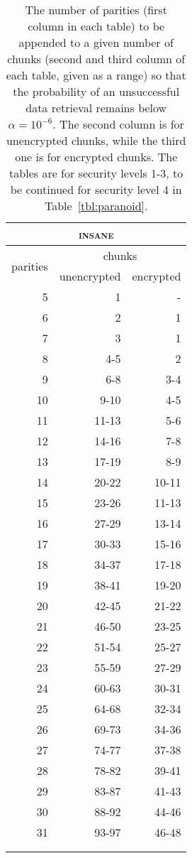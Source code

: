 \documentclass[a4paper,11pt]{article}
\begin{document}
\begin{table}[!ht]
\begin{minipage}{.49\linewidth}
\begin{tabular}{|r|r|r|}
\multicolumn{3}{c}{\textsc{insane}}\\\hline
\multirow{2}{1.5cm}{\centering 
 parities } 
&\multicolumn{2}{|c|}{ chunks }\\\cline{2-3}
&\multicolumn{1}{|c|}{unencrypted} 
&\multicolumn{1}{|c|}{encrypted} \\\hline\hline
5 & 1     &-   \\
6 & 2     & 1\\
7 & 3     & 1\\ 
8 & 4-5   & 2\\ 
9 & 6-8   & 3-4\\
10 & 9-10  & 4-5\\
11 & 11-13 & 5-6\\
12 & 14-16 & 7-8\\
13 & 17-19 & 8-9\\
14 & 20-22 & 10-11\\
15 & 23-26 & 11-13\\
16 & 27-29 & 13-14\\
17 & 30-33 & 15-16\\
18 & 34-37 & 17-18\\
19 & 38-41 & 19-20\\
20 & 42-45 & 21-22\\
21 & 46-50 & 23-25\\
22 & 51-54 & 25-27\\
23 & 55-59 & 27-29\\
24 & 60-63 & 30-31\\
25 & 64-68 & 32-34\\
26 & 69-73 & 34-36\\
27 & 74-77 & 37-38\\
28 & 78-82 & 39-41\\
29 & 83-87 & 41-43\\
30 & 88-92 & 44-46\\
31 & 93-97 & 46-48\\
\hline
\multicolumn{3}{c}{}\\
\multicolumn{3}{c}{}
\end{tabular}
\end{minipage}
\caption{The number of parities (first column in each table) to be appended to a given number of chunks (second and third column of each table, given as a range) so that the probability of an unsuccessful data retrieval remains below $\alpha = 10^{-6}$. The second column is for unencrypted  chunks, while the third one is for encrypted chunks. The tables are for security levels 1-3, to be continued for security level 4 in Table~\ref{tbl:paranoid}.}
\label{tbl:parities}
\end{table}
\end{document}
